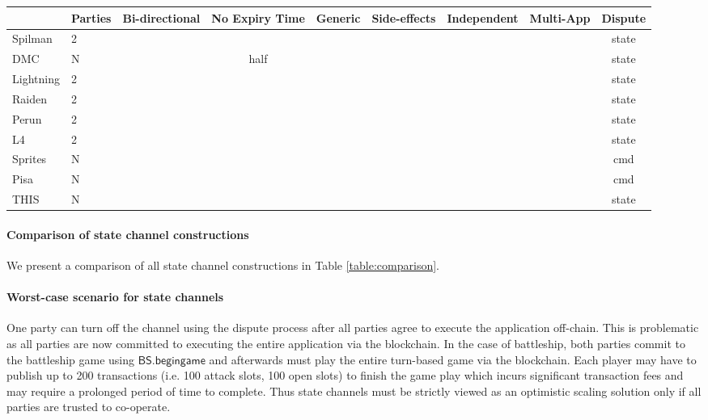 \documentclass{llncs}
\newcommand{\cmark}{\ding{51}}%
\newcommand{\xmark}{\ding{55}}%
\newcommand{\battleshipbegin}{\mathsf{BS.begingame}}
\begin{document}
\begin{table*}
	\begin{center}
		\begin{tabular}[]{l l c c c c c c c }
			\hline 
			& Parties& Bi-directional & No Expiry Time & Generic & Side-effects & Independent & Multi-App & Dispute\\
			\hline 
			Spilman & 2 & \xmark & \xmark & \xmark & \xmark & \xmark & \xmark& state \\ 
			DMC & N & \cmark & half & \xmark & \xmark & \xmark & \xmark & state  \\ 
			Lightning & 2 & \cmark & \cmark & \xmark & \xmark & \xmark & \xmark & state \\ 
			Raiden & 2 & \cmark & \cmark & \xmark & \xmark & \xmark & \xmark & state\\ 
			Perun & 2 & \cmark & \cmark & \cmark & \xmark & \xmark & \cmark & state \\ 
			L4 & 2 & \cmark & \cmark & \cmark & \xmark & \xmark & \cmark & state \\ 
			Sprites & N & \cmark & \cmark & \cmark & \cmark & \xmark & \xmark  & cmd \\ 
			Pisa & N & \cmark & \cmark & \cmark & \cmark & \cmark & \xmark  & cmd \\ 
			THIS & N & \cmark & \cmark & \cmark & \xmark & \cmark & \xmark  & state \\ 
			\hline 
		\end{tabular}
	\end{center}
	\caption{A comparison of the channel constructions. }
	\label{table:comparison}
\end{table*}


\paragraph{Comparison of state channel constructions} 
We present a comparison of all state channel constructions in Table \ref{table:comparison}. 
\paragraph{Worst-case scenario for state channels} 

One party can turn off the channel using the dispute process after all parties agree to execute the application off-chain.   
This is problematic as all parties are now committed to executing the entire application via the blockchain.
In the case of battleship, both parties commit to the battleship game using $\battleshipbegin$ and afterwards must play the entire turn-based game via the blockchain. 
Each player may have to publish up to 200 transactions (i.e. 100 attack slots, 100 open slots) to finish the game play which incurs significant transaction fees and may require a prolonged period of time to complete. 
Thus state channels must be strictly viewed as an optimistic scaling solution only if all parties are trusted to co-operate.  
\end{document}
